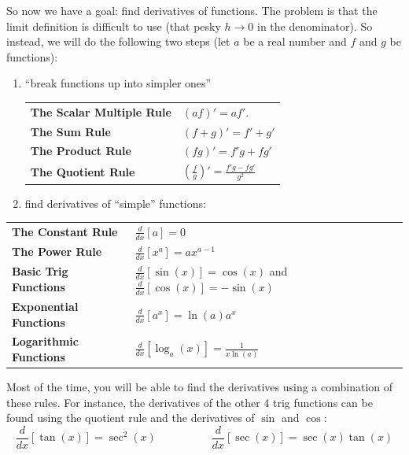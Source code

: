 \documentclass{article}
\theoremstyle{definition}
\theoremstyle{definition}
\begin{document}
So now we have a goal: find derivatives of functions. The problem is that the limit definition is difficult to use (that pesky $h\to 0$ in the denominator). So instead, we will do the following two steps (let $a$ be a real number and $f$ and $g$ be functions):
\begin{enumerate}
\item ``break functions up into simpler ones''

\begin{center}
\def\arraystretch{1.5}
\begin{tabular}{@{}ll@{}}
\toprule[0.4mm]
\textbf{The Scalar Multiple Rule} & $(af)' = af'$. \\
\textbf{The Sum Rule} & $(f + g)' = f' + g'$ \\
\textbf{The Product Rule} & $(fg)' = f'g + fg'$ \\
\textbf{The Quotient Rule} & $\left(\frac{f}{g}\right)' = \frac{f'g - fg'}{g^2}$ \\
\bottomrule[0.4mm]
\end{tabular}
\end{center}

\item find derivatives of ``simple'' functions:

\end{enumerate}


\begin{center}
\def\arraystretch{1.5}
\begin{tabular}{@{}ll@{}}
\toprule[0.4mm]
\textbf{The Constant Rule}     & $\frac{d}{dx}[a] = 0$ \\
\textbf{The Power Rule}        & $\frac{d}{dx}[x^a] = ax^{a-1}$ \\
\textbf{Basic Trig Functions}  & $\frac{d}{dx}[\sin(x)] = \cos(x)$ and $\frac{d}{dx}[\cos(x)] = -\sin(x)$ \\
\textbf{Exponential Functions} & $\frac{d}{dx}[a^x] = \ln(a)a^x$ \\
\textbf{Logarithmic Functions} & $\frac{d}{dx}[\log_a(x)] = \frac{1}{x\ln(a)}$ \\
\bottomrule[0.4mm]
\end{tabular}
\end{center}


Most of the time, you will be able to find the derivatives using a combination of these rules. For instance, the derivatives of the other 4 trig functions can be found using the quotient rule and the derivatives of $\sin$ and $\cos$:
$$\frac{d}{dx}[\tan(x)] = \sec^2(x)
\quad\quad\quad\quad\quad
\frac{d}{dx}[\sec(x)] = \sec(x)\tan(x)$$
\end{document}
